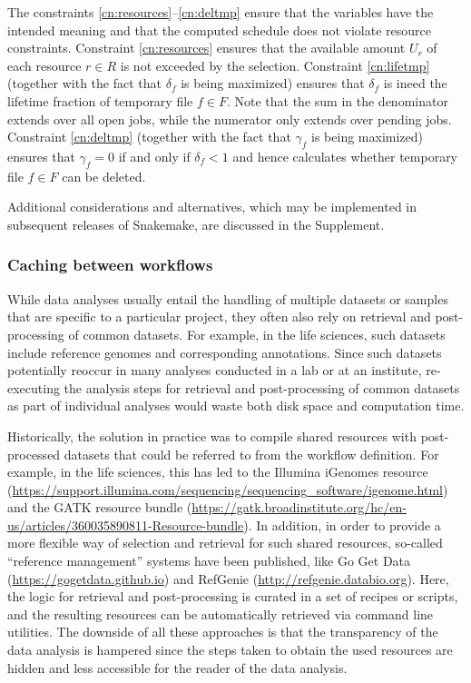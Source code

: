 \documentclass[10pt,a4paper,twocolumn]{article}
\let\plainurl\url
\renewcommand{\url}[1]{\protect\plainurl{#1}}
\begin{document}
The constraints \eqref{cn:resources}--\eqref{cn:deltmp} ensure that the variables have the intended meaning and that the computed schedule does not violate resource constraints.
Constraint \eqref{cn:resources} ensures that the available amount $U_r$ of each resource $r \in R$ is not exceeded by the selection.
Constraint \eqref{cn:lifetmp} (together with the fact that $\delta_f$ is being maximized) ensures that $\delta_{f}$ is ineed the lifetime fraction of temporary file $f \in F$.
Note that the sum in the denominator extends over all open jobs, while the numerator only extends over pending jobs.
Constraint \eqref{cn:deltmp} (together with the fact that $\gamma_f$ is being maximized) ensures that $\gamma_f=0$ if and only if $\delta_f < 1$ and hence calculates whether temporary file $f \in F$ can be deleted.

Additional considerations and alternatives, which may be implemented in subsequent releases of Snakemake, are discussed in the Supplement.

\subsubsection{Caching between workflows}\label{sec:caching}

While data analyses usually entail the handling of multiple datasets or samples that are specific to a particular project, they often also rely on retrieval and post-processing of common datasets.
For example, in the life sciences, such datasets include reference genomes and corresponding annotations.
Since such datasets potentially reoccur in many analyses conducted in a lab or at an institute, re-executing the analysis steps for retrieval and post-processing of common datasets as part of individual analyses would waste both disk space and computation time.

Historically, the solution in practice was to compile shared resources with post-processed datasets that could be referred to from the workflow definition.
For example, in the life sciences, this has led to the Illumina iGenomes resource (\url{https://support.illumina.com/sequencing/sequencing\_software/igenome.html}) and the GATK resource bundle (\url{https://gatk.broadinstitute.org/hc/en-us/articles/360035890811-Resource-bundle}).
In addition, in order to provide a more flexible way of selection and retrieval for such shared resources, so-called ``reference management'' systems have been published, like Go Get Data (\url{https://gogetdata.github.io}) and RefGenie (\url{http://refgenie.databio.org}).
Here, the logic for retrieval and post-processing is curated in a set of recipes or scripts, and the resulting resources can be automatically retrieved via command line utilities.
The downside of all these approaches is that the transparency of the data analysis is hampered since the steps taken to obtain the used resources are hidden and less accessible for the reader of the data analysis.
\end{document}
